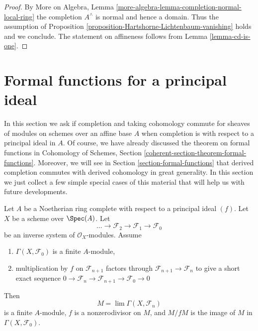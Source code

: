 \begin{proof}
By More on Algebra, Lemma
\ref{more-algebra-lemma-completion-normal-local-ring}
the completion $A^\wedge$ is normal and hence a domain.
Thus the assumption of
Proposition \ref{proposition-Hartshorne-Lichtenbaum-vanishing}
holds and we conclude. The statement on affineness
follows from Lemma \ref{lemma-cd-is-one}.
\end{proof}





\section{Formal functions for a principal ideal}
\label{section-formal-functions-principal}

\noindent
In this section we ask if completion and taking cohomology commute
for sheaves of modules on schemes over an affine base $A$ when completion
is with respect to a principal ideal in $A$. Of course, we have already
discussed the theorem on formal functions in
Cohomology of Schemes, Section \ref{coherent-section-theorem-formal-functions}.
Moreover, we will see in Section \ref{section-formal-functions}
that derived completion commutes with derived cohomology in great generality.
In this section we just collect a few simple special cases of this material
that will help us with future developments.

\begin{lemma}
\label{lemma-limit-finite}
Let $A$ be a Noetherian ring complete with respect to a principal ideal $(f)$.
Let $X$ be a scheme over $\Spec(A)$. Let
$$
\ldots \to \mathcal{F}_2 \to \mathcal{F}_1 \to \mathcal{F}_0
$$
be an inverse system of $\mathcal{O}_X$-modules. Assume
\begin{enumerate}
\item $\Gamma(X, \mathcal{F}_0)$ is a finite $A$-module,
\item multiplication by $f$ on $\mathcal{F}_{n + 1}$ factors
through $\mathcal{F}_{n + 1} \to \mathcal{F}_n$ to give a
short exact sequence
$0 \to \mathcal{F}_n \to \mathcal{F}_{n + 1} \to \mathcal{F}_0 \to 0$
\end{enumerate}
Then
$$
M = \lim \Gamma(X, \mathcal{F}_n)
$$
is a finite $A$-module, $f$ is a nonzerodivisor on $M$, and
$M/fM$ is the image of $M$ in $\Gamma(X, \mathcal{F}_0)$.
\end{lemma}

